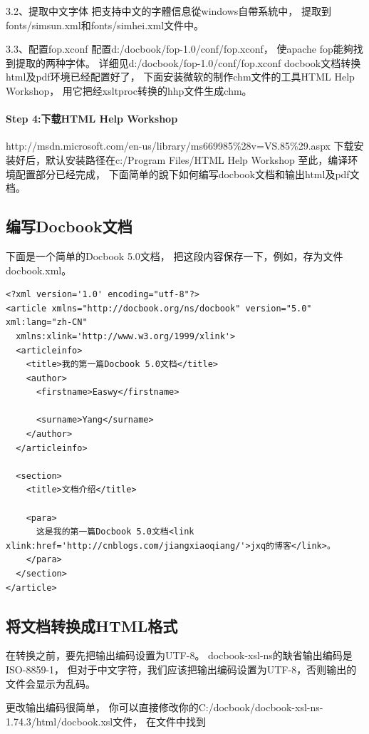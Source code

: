 \documentclass{book}
\begin{document}
3.2、提取中文字体
把支持中文的字體信息從windows自帶系統中，
提取到fonts/simsun.xml和fonts/simhei.xml文件中。

3.3、配置fop.xconf
配置d:/docbook/fop-1.0/conf/fop.xconf，
使apache fop能夠找到提取的两种字体。
详细见d:/docbook/fop-1.0/conf/fop.xconf
docbook文档转换html及pdf环境已经配置好了，
下面安装微软的制作chm文件的工具HTML Help Workshop，
用它把经xsltproc转换的hhp文件生成chm。

\paragraph{Step 4:下载HTML Help Workshop}

http://msdn.microsoft.com/en-us/library/ms669985\%28v=VS.85\%29.aspx
下载安装好后，默认安装路径在c:/Program Files/HTML Help Workshop
至此，编译环境配置部分已经完成，
下面简单的說下如何编写docbook文档和输出html及pdf文档。

\subsection{编写Docbook文档}

下面是一个简单的Docbook 5.0文档，
把这段内容保存一下，例如，存为文件docbook.xml。

\begin{lstlisting}
<?xml version='1.0' encoding="utf-8"?>
<article xmlns="http://docbook.org/ns/docbook" version="5.0" xml:lang="zh-CN"
  xmlns:xlink='http://www.w3.org/1999/xlink'>
  <articleinfo>
    <title>我的第一篇Docbook 5.0文档</title>
    <author>
      <firstname>Easwy</firstname>

      <surname>Yang</surname>
    </author>
  </articleinfo> 
                  
  <section>   
    <title>文档介绍</title>

    <para>
      这是我的第一篇Docbook 5.0文档<link xlink:href='http://cnblogs.com/jiangxiaoqiang/'>jxq的博客</link>。
    </para>
  </section>
</article>
\end{lstlisting}

\subsection{将文档转换成HTML格式}

 在转换之前，要先把输出编码设置为UTF-8。
 docbook-xsl-ns的缺省输出编码是ISO-8859-1，
 但对于中文字符，我们应该把输出编码设置为UTF-8，否则输出的文件会显示为乱码。

更改输出编码很简单，
你可以直接修改你的C:/docbook/docbook-xsl-ns-1.74.3/html/docbook.xsl文件，
在文件中找到 
\end{document}
